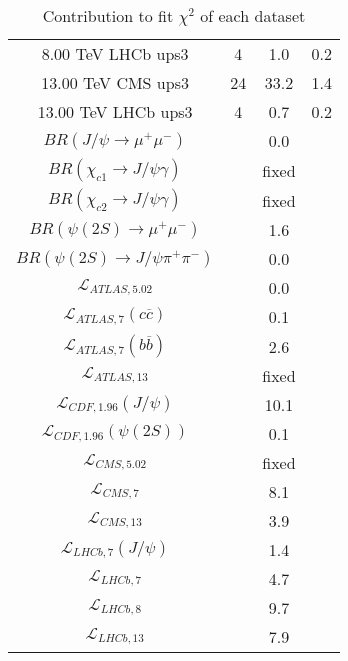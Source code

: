 \begin{table}[h!]
\begin{tabular}{c|c|c|c}
8.00 TeV LHCb ups3 & 4 & 1.0 & 0.2 \\
13.00 TeV CMS ups3 & 24 & 33.2 & 1.4 \\
13.00 TeV LHCb ups3 & 4 & 0.7 & 0.2 \\
\hline
$BR(J/\psi\rightarrow\mu^+\mu^-)$ &  & 0.0 &  \\
$BR(\chi_{c1}\rightarrow J/\psi\gamma)$ &  & fixed & \\
$BR(\chi_{c2}\rightarrow J/\psi\gamma)$ &  & fixed & \\
$BR(\psi(2S)\rightarrow\mu^+\mu^-)$ &  & 1.6 &  \\
$BR(\psi(2S)\rightarrow J/\psi\pi^+\pi^-)$ &  & 0.0 &  \\
$\mathcal L_{ATLAS,5.02}$ &  & 0.0 &  \\
$\mathcal L_{ATLAS,7}(c\overline c)$ &  & 0.1 &  \\
$\mathcal L_{ATLAS,7}(b\overline b)$ &  & 2.6 &  \\
$\mathcal L_{ATLAS,13}$ &  & fixed & \\
$\mathcal L_{CDF,1.96}(J/\psi)$ &  & 10.1 &  \\
$\mathcal L_{CDF,1.96}(\psi(2S))$ &  & 0.1 &  \\
$\mathcal L_{CMS,5.02}$ &  & fixed & \\
$\mathcal L_{CMS,7}$ &  & 8.1 &  \\
$\mathcal L_{CMS,13}$ &  & 3.9 &  \\
$\mathcal L_{LHCb,7}(J/\psi)$ &  & 1.4 &  \\
$\mathcal L_{LHCb,7}$ &  & 4.7 &  \\
$\mathcal L_{LHCb,8}$ &  & 9.7 &  \\
$\mathcal L_{LHCb,13}$ &  & 7.9 &  \\
\end{tabular}
\caption{Contribution to fit $\chi^2$ of each dataset}
\end{table}
